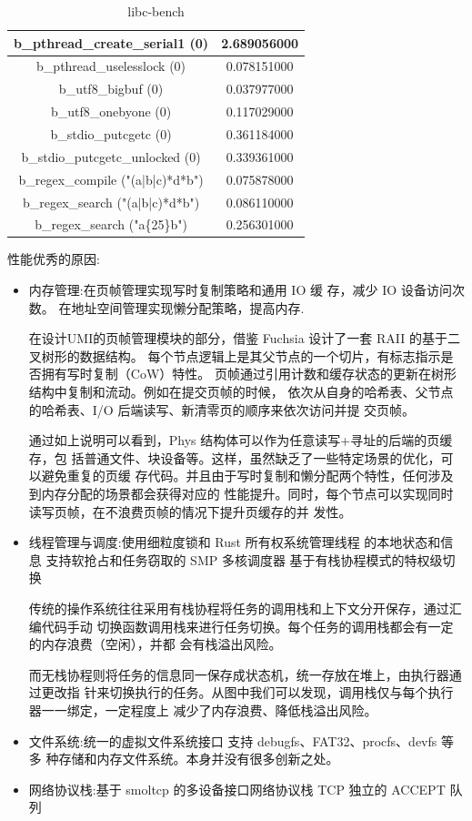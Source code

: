 \begin{table}
\begin{tabular}{|c|c|}
        \hline
        b\_pthread\_create\_serial1 (0) & 2.689056000 \\
        \hline
        b\_pthread\_uselesslock (0) & 0.078151000 \\
        \hline
        b\_utf8\_bigbuf (0) & 0.037977000 \\
        \hline
        b\_utf8\_onebyone (0) & 0.117029000 \\
        \hline
        b\_stdio\_putcgetc (0) & 0.361184000 \\
        \hline
        b\_stdio\_putcgetc\_unlocked (0) & 0.339361000 \\
        \hline
        b\_regex\_compile ("(a|b|c)*d*b") & 0.075878000 \\
        \hline
        b\_regex\_search ("(a|b|c)*d*b") & 0.086110000 \\
        \hline
        b\_regex\_search ("a\{25\}b") & 0.256301000 \\
        \hline
    \end{tabular}
    \caption{libc-bench}
\end{table}

性能优秀的原因:
\begin{itemize}
    \item 内存管理:在页帧管理实现写时复制策略和通用 IO 缓
存，减少 IO 设备访问次数。
在地址空间管理实现懒分配策略，提高内存.

在设计UMI的页帧管理模块的部分，借鉴 Fuchsia 设计了一套 RAII 的基于二叉树形的数据结构。
每个节点逻辑上是其父节点的一个切片，有标志指示是否拥有写时复制（CoW）特性。
页帧通过引用计数和缓存状态的更新在树形结构中复制和流动。例如在提交页帧的时候，
依次从自身的哈希表、父节点的哈希表、I/O 后端读写、新清零页的顺序来依次访问并提
交页帧。

通过如上说明可以看到，Phys 结构体可以作为任意读写+寻址的后端的页缓存，包
括普通文件、块设备等。这样，虽然缺乏了一些特定场景的优化，可以避免重复的页缓
存代码。并且由于写时复制和懒分配两个特性，任何涉及到内存分配的场景都会获得对应的
性能提升。同时，每个节点可以实现同时读写页帧，在不浪费页帧的情况下提升页缓存的并
发性。
    \item 线程管理与调度:使用细粒度锁和 Rust 所有权系统管理线程
的本地状态和信息
支持软抢占和任务窃取的 SMP 多核调度器
基于有栈协程模式的特权级切换

传统的操作系统往往采用有栈协程将任务的调用栈和上下文分开保存，通过汇编代码手动
切换函数调用栈来进行任务切换。每个任务的调用栈都会有一定的内存浪费（空闲），并都
会有栈溢出风险。

而无栈协程则将任务的信息同一保存成状态机，统一存放在堆上，由执行器通过更改指
针来切换执行的任务。从图中我们可以发现，调用栈仅与每个执行器一一绑定，一定程度上
减少了内存浪费、降低栈溢出风险。

    \item 文件系统:统一的虚拟文件系统接口
支持 debugfs、FAT32、procfs、devfs 等多
种存储和内存文件系统。本身并没有很多创新之处。
    \item 网络协议栈:基于 smoltcp 的多设备接口网络协议栈
TCP 独立的 ACCEPT 队列
\end{itemize}

